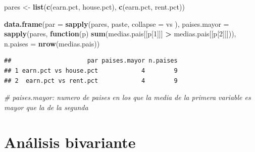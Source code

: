 \documentclass[water,article,submit,pdftex,moreauthors]{Definitions/mdpi}
\newenvironment{Shaded}{\begin{snugshade}}{\end{snugshade}}
\newcommand{\AttributeTok}[1]{\textcolor[rgb]{0.13,0.29,0.53}{#1}}
\newcommand{\CommentTok}[1]{\textcolor[rgb]{0.56,0.35,0.01}{\textit{#1}}}
\newcommand{\ControlFlowTok}[1]{\textcolor[rgb]{0.13,0.29,0.53}{\textbf{#1}}}
\newcommand{\DecValTok}[1]{\textcolor[rgb]{0.00,0.00,0.81}{#1}}
\newcommand{\FunctionTok}[1]{\textcolor[rgb]{0.13,0.29,0.53}{\textbf{#1}}}
\newcommand{\NormalTok}[1]{#1}
\newcommand{\OtherTok}[1]{\textcolor[rgb]{0.56,0.35,0.01}{#1}}
\newcommand{\SpecialCharTok}[1]{\textcolor[rgb]{0.81,0.36,0.00}{\textbf{#1}}}
\newcommand{\StringTok}[1]{\textcolor[rgb]{0.31,0.60,0.02}{#1}}
\begin{document}
\begin{Shaded}
\begin{Highlighting}[]
\NormalTok{pares }\OtherTok{\textless{}{-}} \FunctionTok{list}\NormalTok{(}\FunctionTok{c}\NormalTok{(}\StringTok{\textquotesingle{}earn.pct\textquotesingle{}}\NormalTok{, }\StringTok{\textquotesingle{}house.pct\textquotesingle{}}\NormalTok{), }\FunctionTok{c}\NormalTok{(}\StringTok{\textquotesingle{}earn.pct\textquotesingle{}}\NormalTok{, }\StringTok{\textquotesingle{}rent.pct\textquotesingle{}}\NormalTok{))}

\FunctionTok{data.frame}\NormalTok{(}\AttributeTok{par =} \FunctionTok{sapply}\NormalTok{(pares, paste, }\AttributeTok{collapse =} \StringTok{\textquotesingle{} vs \textquotesingle{}}\NormalTok{), }\AttributeTok{paises.mayor =} \FunctionTok{sapply}\NormalTok{(pares, }\ControlFlowTok{function}\NormalTok{(p) }\FunctionTok{sum}\NormalTok{(medias.pais[[p[}\DecValTok{1}\NormalTok{]]] }\SpecialCharTok{\textgreater{}}\NormalTok{ medias.pais[[p[}\DecValTok{2}\NormalTok{]]])), }\AttributeTok{n.paises =} \FunctionTok{nrow}\NormalTok{(medias.pais))}
\end{Highlighting}
\end{Shaded}

\begin{verbatim}
##                     par paises.mayor n.paises
## 1 earn.pct vs house.pct            4        9
## 2  earn.pct vs rent.pct            4        9
\end{verbatim}

\begin{Shaded}
\begin{Highlighting}[]
\CommentTok{\# paises.mayor: numero de paises en los que la media de la primera variable es mayor que la de la segunda}
\end{Highlighting}
\end{Shaded}

\section{Análisis bivariante}\label{anuxe1lisis-bivariante}
\end{document}
